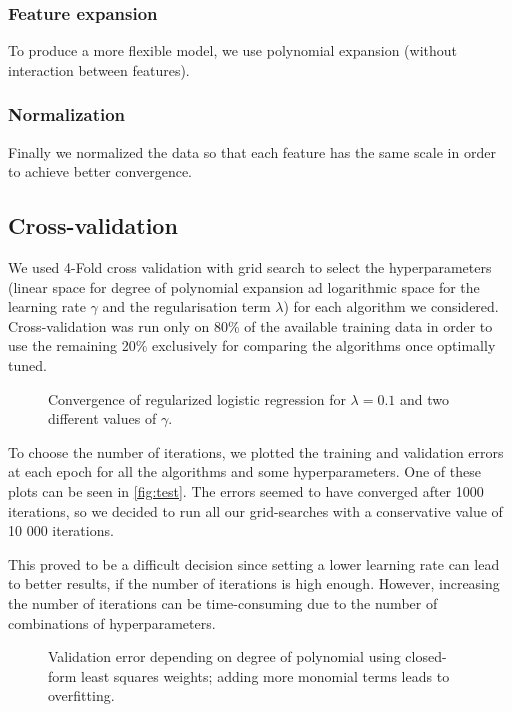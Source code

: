 \documentclass[10pt,conference,compsocconf]{IEEEtran}
\begin{document}
\subsubsection{Feature expansion}
To produce a more flexible model, we use polynomial expansion (without interaction between features).

\subsubsection{Normalization}
Finally we normalized the data so that each feature has the same scale in order to achieve better convergence.

\subsection{Cross-validation}
We used 4-Fold cross validation with grid search to select the hyperparameters (linear space for degree of polynomial expansion ad logarithmic space for the learning rate $\gamma$ and the regularisation term $\lambda$) for each algorithm we considered. Cross-validation was run only on 80\% of the available training data in order to use the remaining 20\% exclusively for comparing the algorithms once optimally tuned.

\begin{figure}
  \centering
  
  \vspace{-3mm}
  \caption{Convergence of regularized logistic regression for $\lambda = 0.1$ and two
  different values of $\gamma$.}
  \label{fig:test}
\end{figure}


To choose the number of iterations, we plotted the training and validation errors at each epoch for all the algorithms and some hyperparameters.
One of these plots can
be seen in \autoref{fig:test}.
The errors seemed to have converged after 1000 iterations, so we decided to run all our grid-searches with a conservative value of 10 000 iterations.


This proved to be a difficult decision since setting a lower learning rate can lead to better results, if the number of iterations is high enough.
However, increasing the number of iterations can be time-consuming due to the number of combinations of hyperparameters.

\begin{figure}
  \centering
  
  \vspace{-3mm}
  \caption{Validation error depending on degree of polynomial using closed-form least squares weights; adding more monomial terms leads to overfitting.}
  \label{fig:overfitting}
  \vspace{-4mm}
\end{figure}
\end{document}
